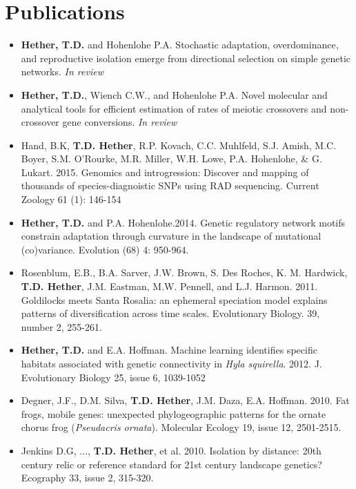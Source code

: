 \documentclass[11pt,letterpaper,sans]{moderncv}        %
\begin{document}
\section{Publications}
\begin{itemize}
\item \textbf{Hether, T.D.} and Hohenlohe P.A. Stochastic adaptation, overdominance, and reproductive isolation emerge from directional selection on simple genetic networks. \textit{In review}
\vspace{4pt}
\item \textbf{Hether, T.D.}, Wiench C.W., and Hohenlohe P.A. Novel molecular and analytical tools for efficient estimation of rates of meiotic crossovers and non-crossover gene conversions. \textit{In review}
\vspace{4pt}
\item Hand, B.K, \textbf{T.D. Hether}, R.P. Kovach, C.C. Muhlfeld, S.J. Amish, M.C. Boyer, S.M. O'Rourke, M.R. Miller, W.H. Lowe, P.A. Hohenlohe, \& G. Lukart. 2015. Genomics and introgression: Discover and mapping of thousands of species-diagnoistic SNPs using RAD sequencing.  Current Zoology 61 (1): 146-154
\vspace{4pt}
\item \textbf{Hether, T.D.} and P.A. Hohenlohe.2014. Genetic regulatory network motifs constrain adaptation through curvature in the landscape of mutational (co)variance. Evolution (68) 4: 950-964.
\vspace{4pt}
\item Rosenblum, E.B., B.A. Sarver, J.W. Brown, S. Des Roches, K. M. Hardwick, \textbf{T.D. Hether}, J.M. Eastman, M.W. Pennell, and L.J. Harmon. 2011. Goldilocks meets Santa Rosalia: an ephemeral speciation model explains patterns of diversification across time scales. Evolutionary Biology. 39, number 2, 255-261.
\vspace{4pt}
\item \textbf{Hether, T.D.} and E.A. Hoffman. Machine learning identifies specific habitats associated with genetic connectivity in \emph{Hyla squirella}. 2012. J. Evolutionary Biology 25, issue 6, 1039-1052
\vspace{4pt}
\item Degner, J.F., D.M. Silva, \textbf{T.D. Hether}, J.M. Daza, E.A. Hoffman. 2010. Fat frogs, mobile genes: unexpected phylogeographic patterns for the ornate chorus frog (\emph{Pseudacris ornata}). Molecular Ecology 19, issue 12, 2501-2515.
\vspace{4pt}
\item Jenkins D.G, ..., \textbf{T.D. Hether}, et al. 2010. Isolation by distance: 20th century relic or reference standard for 21st century landscape genetics?  Ecography 33, issue 2, 315-320.

\end{itemize}
\end{document}
